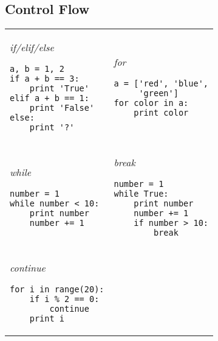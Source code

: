\documentclass[10pt, a4paper, twocolumn]{article}
\begin{document}
\subsection*{Control Flow}
\begin{tabular}{ p{} p{} }
  \begin{minipage}[t]{\columnwidth}
    \textit{if/elif/else}
\begin{verbatim}
a, b = 1, 2
if a + b == 3:
    print 'True'
elif a + b == 1:
    print 'False'
else:
    print '?'
\end{verbatim}
  \end{minipage}
  &
    \begin{minipage}[t]{\columnwidth}
      \textit{for}
\begin{verbatim}
a = ['red', 'blue',
     'green']
for color in a:
    print color
\end{verbatim}
    \end{minipage}\\
  \rule{0pt}{0.5cm}

  \begin{minipage}[t]{\columnwidth}
    \textit{while}
\begin{verbatim}
number = 1
while number < 10:
    print number
    number += 1
\end{verbatim}
  \end{minipage}
  &
    \begin{minipage}[t]{\columnwidth}
      \textit{break}
\begin{verbatim}
number = 1
while True:
    print number
    number += 1
    if number > 10:
        break
\end{verbatim}
    \end{minipage}\\
  \rule{0pt}{0.5cm}

  \begin{minipage}[t]{\columnwidth}
    \textit{continue}
\begin{verbatim}
for i in range(20):
    if i % 2 == 0:
        continue
    print i
\end{verbatim}
  \end{minipage}
  &
\end{tabular}
\end{document}
